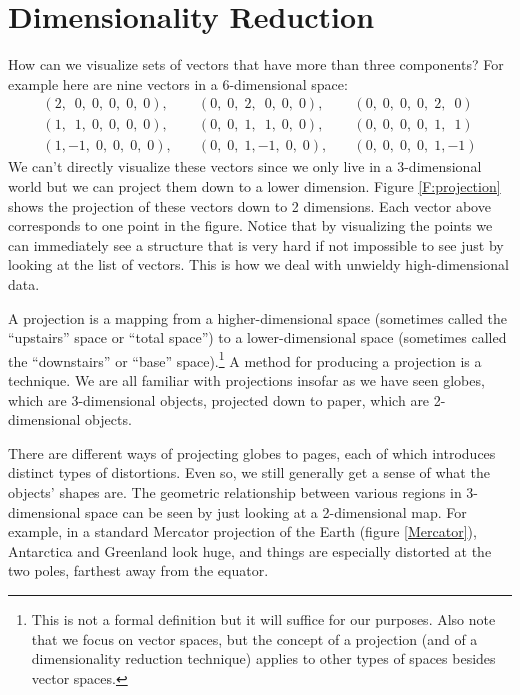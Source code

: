 \section{Dimensionality Reduction}
\label{S:dimred}


   How can we visualize sets of vectors that have more than three components?  For
example here are nine vectors in a 6-dimensional space:
\[
\begin{array}{rrr}
  ( 2,\;~0,\; 0,\; 0,\; 0,\; 0), \quad
& ( 0,\; 0,\; 2,\;~0,\; 0,\; 0), \quad
& ( 0,\; 0,\; 0,\; 0,\; 2,\;~0)  \\
  ( 1,\;~1,\; 0,\; 0,\; 0,\; 0), \quad
& ( 0,\; 0,\; 1,\;~1,\; 0,\; 0), \quad
& ( 0,\; 0,\; 0,\; 0,\; 1,\;~1)  \\
  ( 1,  -1,\; 0,\; 0,\; 0,\; 0), \quad
& ( 0,\; 0,\; 1,  -1,\; 0,\; 0), \quad
& ( 0,\; 0,\; 0,\; 0,\; 1,  -1)
\end{array}
\]
We can't directly visualize these vectors since we only live in a 3-dimensional 
world but we can project them down to a lower dimension. Figure
\ref{F:projection} shows the projection of these vectors down to 2 dimensions.
Each vector above corresponds to one point in the figure. Notice that by 
visualizing the points we can immediately see a structure that is very hard if 
not impossible to see just by looking at the list of vectors. This is how we deal with unwieldy high-dimensional data. 

A projection is a mapping from a higher-dimensional space (sometimes called the ``upstairs'' space or ``total space'') to a lower-dimensional space (sometimes called the ``downstairs'' or ``base'' space).\footnote{This is not a formal definition but it will suffice for our purposes. Also note that we focus on vector spaces, but the concept of a projection (and of a dimensionality reduction technique) applies to other types of spaces besides vector spaces.} A method for producing a projection is a  technique. We are all 
familiar with projections insofar as we have seen globes, which are 3-dimensional objects, projected down to paper, which are 2-dimensional objects. 

    There are different ways of projecting globes to pages, each of which introduces distinct types of distortions. Even so, we still generally get a sense of what the objects' shapes are. The geometric relationship between
various regions in 3-dimensional space can be seen by just looking at a 2-dimensional map. For example, in a standard Mercator projection of the Earth 
(figure \ref{Mercator}), Antarctica and Greenland look huge, and things are 
especially distorted at the two poles, farthest away from the equator.

